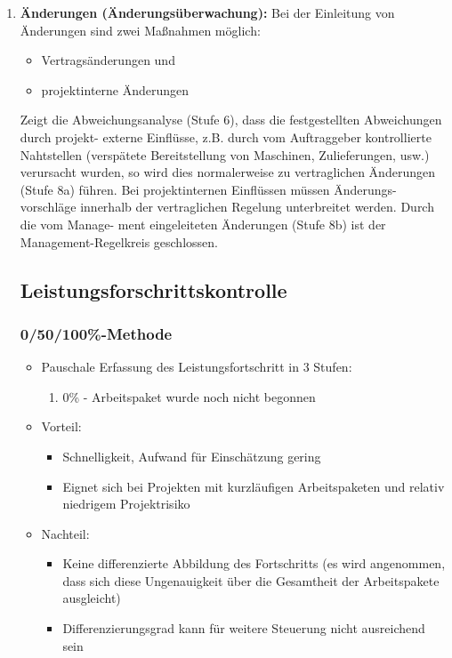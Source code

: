 \documentclass[11pt,a4paper]{article}
\begin{document}
\begin{enumerate}
	\item \textbf{Änderungen (Änderungsüberwachung):} Bei der Einleitung von Änderungen sind zwei Maßnahmen möglich:
	\begin{itemize}
		\item Vertragsänderungen und
		\item projektinterne Änderungen
	\end{itemize}
	\noindent
	Zeigt die Abweichungsanalyse (Stufe 6), dass die festgestellten Abweichungen durch projekt-
externe Einflüsse, z.B. durch vom Auftraggeber kontrollierte Nahtstellen (verspätete Bereitstellung
von Maschinen, Zulieferungen, usw.) verursacht wurden, so wird dies normalerweise zu
vertraglichen Änderungen (Stufe 8a) führen. Bei projektinternen Einflüssen müssen Änderungs-
vorschläge innerhalb der vertraglichen Regelung unterbreitet werden. Durch die vom Manage-
ment eingeleiteten Änderungen (Stufe 8b) ist der Management-Regelkreis geschlossen.

\subsection{Leistungsforschrittskontrolle}

\subsubsection{0/50/100\%-Methode}

\begin{itemize}
	\item Pauschale Erfassung des Leistungsfortschritt in 3 Stufen:
		\begin{enumerate}
			\item 0\% - Arbeitspaket wurde noch nicht begonnen
		\end{enumerate}
	\item Vorteil:
		\begin{itemize}
			\item Schnelligkeit, Aufwand für Einschätzung gering
			\item Eignet sich bei Projekten mit kurzläufigen Arbeitspaketen und relativ niedrigem Projektrisiko
		\end{itemize}
		
	\item Nachteil:
		\begin{itemize}
			\item Keine differenzierte Abbildung des Fortschritts (es wird
angenommen, dass sich diese Ungenauigkeit über die
Gesamtheit der Arbeitspakete ausgleicht)
			\item Differenzierungsgrad kann für weitere Steuerung nicht
ausreichend sein
		\end{itemize}
\end{itemize}
	
\end{enumerate}
\end{document}
